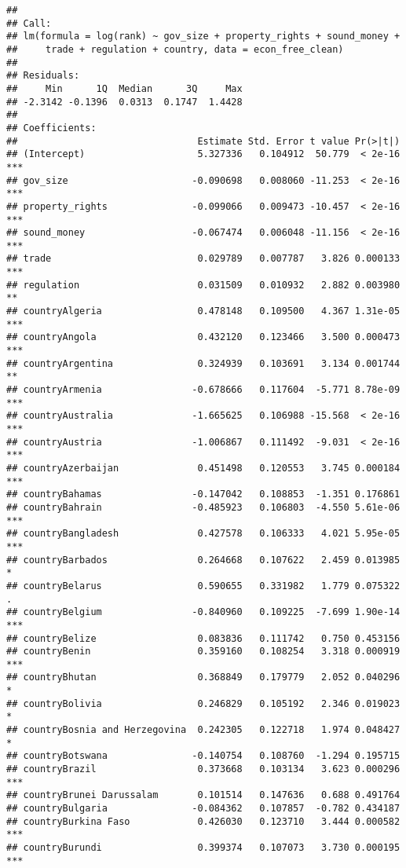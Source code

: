 \documentclass[
  11pt,
]{article}
\begin{document}
\begin{verbatim}
## 
## Call:
## lm(formula = log(rank) ~ gov_size + property_rights + sound_money + 
##     trade + regulation + country, data = econ_free_clean)
## 
## Residuals:
##     Min      1Q  Median      3Q     Max 
## -2.3142 -0.1396  0.0313  0.1747  1.4428 
## 
## Coefficients:
##                                Estimate Std. Error t value Pr(>|t|)    
## (Intercept)                    5.327336   0.104912  50.779  < 2e-16 ***
## gov_size                      -0.090698   0.008060 -11.253  < 2e-16 ***
## property_rights               -0.099066   0.009473 -10.457  < 2e-16 ***
## sound_money                   -0.067474   0.006048 -11.156  < 2e-16 ***
## trade                          0.029789   0.007787   3.826 0.000133 ***
## regulation                     0.031509   0.010932   2.882 0.003980 ** 
## countryAlgeria                 0.478148   0.109500   4.367 1.31e-05 ***
## countryAngola                  0.432120   0.123466   3.500 0.000473 ***
## countryArgentina               0.324939   0.103691   3.134 0.001744 ** 
## countryArmenia                -0.678666   0.117604  -5.771 8.78e-09 ***
## countryAustralia              -1.665625   0.106988 -15.568  < 2e-16 ***
## countryAustria                -1.006867   0.111492  -9.031  < 2e-16 ***
## countryAzerbaijan              0.451498   0.120553   3.745 0.000184 ***
## countryBahamas                -0.147042   0.108853  -1.351 0.176861    
## countryBahrain                -0.485923   0.106803  -4.550 5.61e-06 ***
## countryBangladesh              0.427578   0.106333   4.021 5.95e-05 ***
## countryBarbados                0.264668   0.107622   2.459 0.013985 *  
## countryBelarus                 0.590655   0.331982   1.779 0.075322 .  
## countryBelgium                -0.840960   0.109225  -7.699 1.90e-14 ***
## countryBelize                  0.083836   0.111742   0.750 0.453156    
## countryBenin                   0.359160   0.108254   3.318 0.000919 ***
## countryBhutan                  0.368849   0.179779   2.052 0.040296 *  
## countryBolivia                 0.246829   0.105192   2.346 0.019023 *  
## countryBosnia and Herzegovina  0.242305   0.122718   1.974 0.048427 *  
## countryBotswana               -0.140754   0.108760  -1.294 0.195715    
## countryBrazil                  0.373668   0.103134   3.623 0.000296 ***
## countryBrunei Darussalam       0.101514   0.147636   0.688 0.491764    
## countryBulgaria               -0.084362   0.107857  -0.782 0.434187    
## countryBurkina Faso            0.426030   0.123710   3.444 0.000582 ***
## countryBurundi                 0.399374   0.107073   3.730 0.000195 ***

\end{verbatim}
\end{document}
